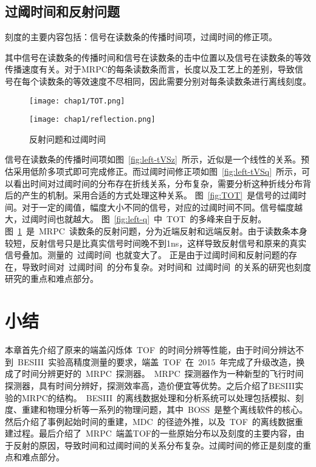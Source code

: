 \subsection{过阈时间和反射问题}
刻度的主要内容包括：信号在读数条的传播时间项，过阈时间的修正项。

其中信号在读数条的传播时间和信号在读数条的击中位置以及信号在读数条的等效传播速度有关。对于MRPC的每条读数条而言，长度以及工艺上的差别，导致信号在每个读数条的等效速度不尽相同，因此需要分别对每条读数条进行离线刻度。

\begin{figure}[!h]
\begin{minipage}[!h]{0.5\linewidth}
\texttt{[image: chap1/TOT.png]}
\label{fig:TOT}
\end{minipage}
\hfill
\begin{minipage}[!h]{0.5\linewidth}
\texttt{[image: chap1/reflection.png]}
\label{fig:reflection}
\end{minipage}%
\caption{反射问题和过阈时间}
\end{figure}
信号在读数条的传播时间项如图~\ref{fig:left-tVSz}~所示，近似是一个线性的关系。预估采用低阶多项式即可完成修正。而过阈时间修正项如图~\ref{fig:left-tVSq}~所示，可以看出时间对过阈时间的分布存在折线关系，分布复杂，需要分析这种折线分布背后的产生的机制。采用合适的方式处理这种关系。
图~\ref{fig:TOT}~是信号的过阈时间。对于一定的阈值，幅度大小不同的信号，对应的过阈时间不同。信号幅度越大，过阈时间也就越大。
图~\ref{fig:left-q}~中~TOT~的多峰来自于反射。
图~\ref{fig:reflection}~是~MRPC~读数条的反射问题，分为近端反射和远端反射。由于读数条本身较短，反射信号只是比真实信号时间晚不到1ns，这样导致反射信号和原来的真实信号叠加。测量的~过阈时间~也就变大了。
正是由于过阈时间和反射问题的存在，导致时间对~过阈时间~的分布复杂。对时间和~过阈时间~的关系的研究也刻度研究的重点和难点部分。

\section{小结}
本章首先介绍了原来的端盖闪烁体~TOF~的时间分辨等性能，由于时间分辨达不到~BESIII~实验高精度测量的要求，端盖~TOF~在~2015~年完成了升级改造，换成了时间分辨更好的~MRPC~探测器。~MRPC~探测器作为一种新型的飞行时间探测器，具有时间分辨好，探测效率高，造价便宜等优势。之后介绍了BESIII实验的MRPC的结构。~BESIII~的离线数据处理和分析系统可以处理包括模拟、刻度、重建和物理分析等一系列的物理问题，其中~BOSS~是整个离线软件的核心。然后介绍了事例起始时间的重建，MDC~的径迹外推，以及~TOF~的离线数据重建过程。最后介绍了~MRPC~端盖TOF的一些原始分布以及刻度的主要内容，由于反射的原因，导致时间和过阈时间的关系分布复杂。过阈时间的修正是刻度的重点和难点部分。







